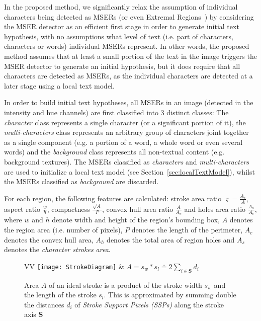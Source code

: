 \documentclass[conference]{IEEEtran}
\begin{document}
In the proposed method, we significantly relax the assumption of individual characters being detected as MSERs (or even Extremal Regions~\cite{Neumann-CVPR2012, Neumann-ICDAR2013}) by considering the MSER detector as an efficient first stage in order to generate initial text hypothesis, with no assumptions what level of text (i.e. part of characters, characters or words) individual MSERs represent. In other words, the proposed method assumes that at least a small portion of the text in the image triggers the MSER detector to generate an initial hypothesis, but it does require that all characters are detected as MSERs, as the individual characters are detected at a later stage using a local text model.

In order to build initial text hypotheses, all MSERs in an image (detected in the intensity and hue channels) are first classified into $3$ distinct classes: The \emph{character} class represents a single character (or a significant portion of it), the \emph{multi-characters} class represents an arbitrary group of characters joint together as a single component (e.g. a portion of a word, a whole word or even several words) and the \emph{background} class represents all non-textual content (e.g. background textures). The MSERs classified as \emph{characters} and \emph{multi-characters} are used to initialize a local text model (see Section~\ref{sec:localTextModel}), whilst the MSERs classified as \emph{background} are discarded.


For each region, the following features are calculated: stroke area ratio $\varsigma = \frac{A_s}{A}$, aspect ratio $\frac{w}{h}$, compactness $\frac{\sqrt{A}}{P}$, convex hull area ratio $\frac{A}{A_c}$ and holes area ratio $\frac{A_h}{A_c}$,
where $w$ and $h$ denote width and height of the region's bounding box, $A$ denotes the region area (i.e. number of pixels), $P$ denotes the length of the perimeter, $A_c$ denotes the convex hull area, $A_h$ denotes the total area of region holes and $A_s$ denotes the \emph{character strokes area}.

\begin{figure}
\centering
\begin{tabular}{VV}
\texttt{[image: StrokeDiagram]} &
$A = s_w*s_l \doteq 2\sum\limits_{ i\in \mathbf{S}} d_i$
\end{tabular}
\caption{Area $A$ of an ideal stroke is a product of the stroke width $s_w$ and the length of the stroke $s_l$. This is approximated by summing double the distances $d_i$ of \emph{Stroke Support Pixels (SSPs)} along the stroke axis $\mathbf{S}$}
\label{fig:strokearea}
\vspace{-5pt}
\end{figure}
\end{document}
